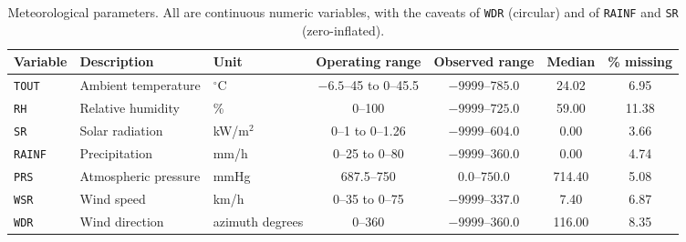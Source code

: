 \begin{table}[pos=t]
  \centering
  \caption{Meteorological parameters. All are continuous numeric variables,
    with the caveats of \texttt{WDR} (circular) and of \texttt{RAINF} and
    \texttt{SR} (zero-inflated).}
  \label{tab:dic-meteo}
  \small
  \begin{tabular}{lllcccc}
    \toprule
    Variable & Description & Unit & Operating range & Observed range & Median & \% missing \\
    \midrule
    \texttt{TOUT}  & Ambient temperature  & $^{\circ}$C        & $-6.5$--45 to 0--45.5 & $-9999$--$785.0$ & 24.02  & 6.95  \\
    \texttt{RH}    & Relative humidity    & \%                 & 0--100                & $-9999$--$725.0$ & 59.00  & 11.38 \\
    \texttt{SR}    & Solar radiation      & kW/m$^2$           & 0--1 to 0--1.26       & $-9999$--$604.0$ & 0.00   & 3.66  \\
    \texttt{RAINF} & Precipitation        & mm/h               & 0--25 to 0--80        & $-9999$--$360.0$ & 0.00   & 4.74  \\
    \texttt{PRS}   & Atmospheric pressure & mmHg               & 687.5--750            & $0.0$--$750.0$   & 714.40 & 5.08  \\
    \texttt{WSR}   & Wind speed           & km/h               & 0--35 to 0--75        & $-9999$--$337.0$ & 7.40   & 6.87  \\
    \texttt{WDR}   & Wind direction       & azimuth degrees    & 0--360                & $-9999$--$360.0$ & 116.00 & 8.35  \\
    \bottomrule
  \end{tabular}
\end{table}

